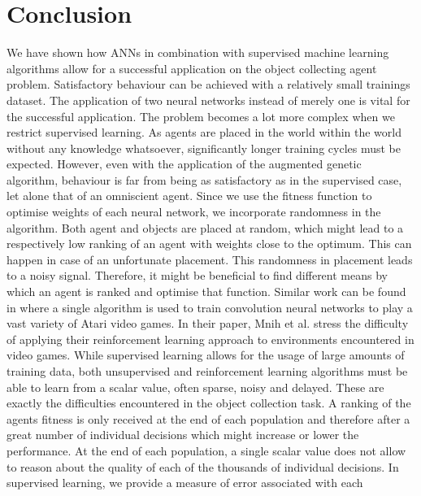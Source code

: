 \documentclass[10pt,a4paper,DIV=11]{scrreprt}
\begin{document}

\chapter{Conclusion}
\label{ch:conclusion}
We have shown how ANNs in combination with supervised machine learning algorithms allow for a successful application on the
object collecting agent problem. Satisfactory behaviour can be achieved with a relatively small trainings dataset. The application of two neural
networks instead of merely one is vital for the successful application. The problem becomes a lot more complex when we restrict supervised learning. As 
agents are placed in the world within the world without any knowledge whatsoever, significantly longer training cycles must be expected. However, 
even with the application of the augmented genetic algorithm, behaviour is far from being as satisfactory as in the supervised case, let alone that
of an omniscient agent. Since we use the fitness function to optimise weights of each neural network, we incorporate randomness in the algorithm. 
Both agent and objects are placed at random, which might lead to a respectively low ranking of an agent with weights close to the optimum. This can 
happen in case of an unfortunate placement. This randomness in placement leads to a noisy signal. Therefore, it might be beneficial to find different means by which an agent is ranked and optimise that
function. Similar work can be found in \cite{DEEPMIND} where a single algorithm is used to train convolution neural networks to play a 
vast variety of Atari video games. In their paper, Mnih et al. stress the difficulty of applying their reinforcement learning approach to environments
encountered in video games. While supervised learning allows for the usage of large amounts of training data, both unsupervised and reinforcement
learning algorithms must be able to learn from a scalar value, often sparse, noisy and delayed. These are exactly the difficulties encountered in
the object collection task. A ranking of the agents fitness is only received at the end of each population and therefore after a great number of
individual decisions which might increase or lower the performance. At the end of each population, a single scalar value does not allow to reason 
about the quality of each of the thousands of individual decisions. In supervised learning, we provide a measure of error associated with each 
\end{document}
